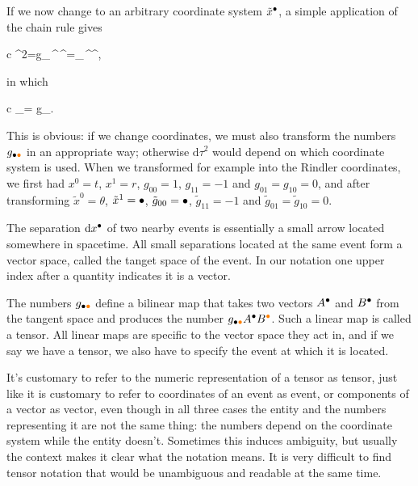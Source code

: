 \documentclass[11pt,oneside%
]{memoir}
\newenvironment{eqna}{\begin{IEEEeqnarray*}{c}}{\end{IEEEeqnarray*}\ignorespacesafterend}
\newcommand{\pder}[2]{\frac{\partial#1}{\partial#2}}
\newcommand{\dd}{\mathrm{d}}
\newcommand{\coa}{{\color{black}\bullet}}
\newcommand{\cob}{{\color{oranssi}\bullet}}
\newcommand{\coc}{{\color{cyan}\bullet}}
\newcommand{\cod}{{\color{red}\bullet}}
\begin{document}
If we now change to an arbitrary coordinate system \(\tilde{x}^\coa\), a simple application of the chain rule gives
\begin{eqna}
\dd\tau^2=g_{\coa\cob}\,\pder{x^\coa}{\tilde{x}^\coc}\dd{}^\coc\,\pder{x^\cob}{\tilde{x}^\cod}\dd{}^\cod=_{\coa\cob}\,\dd {}^\coa\dd {}^\cob,
\end{eqna}
in which
\begin{eqna}
_{\coa\cob}=\pder{x^\coc}{\tilde{x}^\coa}\,\pder{x^\cod}{\tilde{x}^\cob}\,g_{\coc\cod}.
\end{eqna}
This is obvious: if we change coordinates, we must also transform the numbers \(g_{\coa\cob}\) in an appropriate way; otherwise \(\dd\tau^2\) would depend on which coordinate system is used. When we transformed for example into the Rindler coordinates, we first had \(x^0=t\), \(x^1=r\), \(g_{00}=1\), \(g_{11}=-1\) and \(g_{01}=g_{10}=0\), and after transforming \(\tilde{x}^0=\theta\), \(\tilde{x}^1=\coa\), \(\tilde{g}_{00}=\coa\), \(\tilde{g}_{11}=-1\) and \(\tilde{g}_{01}=\tilde{g}_{10}=0\).

The separation \(\dd x^\coa\) of two nearby events is essentially a small arrow located somewhere in spacetime. All small separations located at the same event form a vector space, called the tanget space of the event. In our notation one upper index after a quantity indicates it is a vector.

The numbers \(g_{\coa\cob}\) define a bilinear map that takes two vectors \(A^\coa\) and \(B^\coa\) from the tangent space and produces the number \(g_{\coa\cob}A^\coa B^\cob\). Such a linear map is called a tensor. All linear maps are specific to the vector space they act in, and if we say we have a tensor, we also have to specify the event at which it is located.

It's customary to refer to the numeric representation of a tensor as tensor, just like it is customary to refer to coordinates of an event as event, or components of a vector as vector, even though in all three cases the entity and the numbers representing it are not the same thing: the numbers depend on the coordinate system while the entity doesn't. Sometimes this induces ambiguity, but usually the context makes it clear what the notation means. It is very difficult to find tensor notation that would be unambiguous and readable at the same time.

\end{document}
